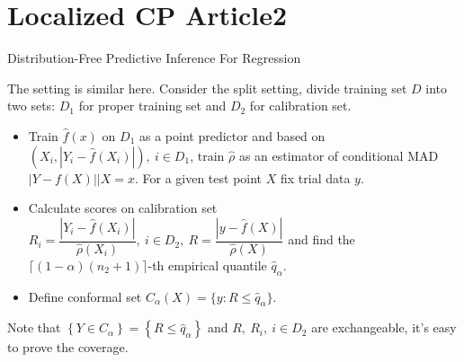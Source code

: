 \documentclass[12pt, a4paper, oneside]{article}
\begin{document}
\section{Localized CP Article2}
    Distribution-Free Predictive Inference For Regression\cite{lei2018distribution}


    The setting is similar here. Consider the split setting, divide training set $D$ into two sets: $D_1$ for proper training set and $D_2$ for calibration set.
    \begin{itemize}
        \item Train $\hat{f}(x)$ on $D_1$ as a point predictor and based on $(X_i,|Y_i-\hat{f}(X_i)|),\ i\in D_1$, train $\hat{\rho}$ as an estimator of conditional MAD $|Y-f(X)|\Big|X=x$. For a given test point $X$ fix trial data $y$.
        \item Calculate scores on calibration set $R_i=\dfrac{|Y_i-\hat{f}(X_i)|}{\hat{\rho}(X_i)},\ i\in D_2,\ R=\dfrac{|y-\hat{f}(X)|}{\hat{\rho}(X)}$ and find the $\lceil(1-\alpha)(n_2+1)\rceil$-th empirical quantile $\hat{q}_\alpha$.
        \item Define conformal set $C_\alpha(X)=\{y:R\leq\hat{q}_\alpha\}$.
    \end{itemize}
    Note that $\left\{ Y\in C_\alpha \right\}=\left\{ R\leq\hat{q}_\alpha \right\}$ and $R,\ R_i,\ i\in D_2$ are exchangeable, it's easy to prove the coverage.
\newpage


\end{document}
